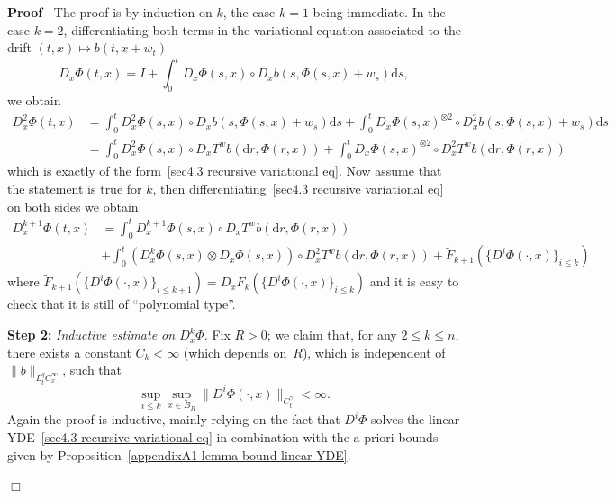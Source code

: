 \documentclass[10pt]{article}
\newcommand{\mathd}{\mathrm{d}}
\newcommand{\nobracket}{}
\newcommand{\tmstrong}[1]{\textbf{#1}}
\newcommand{\tmtextit}[1]{{\itshape{#1}}}
\newenvironment{proof}{\noindent\textbf{Proof\ }}{\hspace*{\fill}$\Box$\medskip}
\begin{document}
\begin{proof}
  The proof is by induction on $k$, the case $k = 1$ being immediate. In the
  case $k = 2$, differentiating both terms in the variational equation
  associated to the drift $(t, x) \mapsto b (t, x + w_t)$
  \[ D_x \Phi (t, x) = I + \int_0^t D_x \Phi (s, x) \circ D_x b (s, \Phi (s,
     x) + w_s) \mathd s, \]
  we obtain
%  
  \begin{align*}
    D_x^2 \Phi (t, x) & = \int_0^t D_x^2 \Phi (s, x) \circ D_x b (s, \Phi (s,
    x) + w_s) \mathd s + \int_0^t D_x \Phi (s, x)^{\otimes 2} \circ D_x^2 b
    (s, \Phi (s, x) + w_s) \mathd s\\
    & = \int_0^t D_x^2 \Phi (s, x) \circ \nobracket D_x T^w b (\mathd r, \Phi
    (r, x) \nobracket) + \int_0^t D_x \Phi (s, x)^{\otimes 2} \circ \nobracket
    D_x^2 T^w b (\mathd r, \Phi (r, x) \nobracket)
  \end{align*}
%  
  which is exactly of the form~{\eqref{sec4.3 recursive variational eq}}. Now
  assume that the statement is true for $k$, then
  differentiating~{\eqref{sec4.3 recursive variational eq}} on both sides we
  obtain
%  
  \begin{align*}
    D_x^{k + 1} \Phi (t, x) & = \int_0^t D_x^{k + 1} \Phi (s, x) \circ
    \nobracket D_x T^w b (\mathd r, \Phi (r, x) \nobracket)\\
    & + \int_0^t (D_x^k \Phi (s, x) \otimes D_x \Phi (s, x)) \circ \nobracket
    D_x^2 T^w b (\mathd r, \Phi (r, x) \nobracket) + \tilde{F}_{k + 1} (\{ D^i
    \Phi (\cdot, x) \}_{i \leqslant k})
  \end{align*}
%  
  where $\tilde{F}_{k + 1} (\{ D^i \Phi (\cdot, x) \}_{i \leqslant k + 1}) =
  D_x F_k (\{ D^i \Phi (\cdot, x) \}_{i \leqslant k})$ and it is easy to check
  that it is still of ``polynomial type''.
  
  {\tmstrong{Step 2:}} \tmtextit{Inductive estimate on $D^k_x \Phi$.} Fix $R >
  0$; we claim that, for any $2 \leqslant k \leqslant n$, there exists a
  constant $C_k < \infty$ (which depends on~$R$), which is independent of $\|
  b \|_{L^q_t C^{\infty}_x}$, such that
  \[ \sup_{i \leqslant k} \sup_{x \in B_R}  \| D^i \Phi (\cdot, x)
     \|_{C^{\gamma}_t} < \infty . \]
  Again the proof is inductive, mainly relying on the fact that $D^i \Phi$
  solves the linear YDE~{\eqref{sec4.3 recursive variational eq}} in
  combination with the a priori bounds given by Proposition~\ref{appendixA1
  lemma bound linear YDE}.
  

\end{proof}
\end{document}
